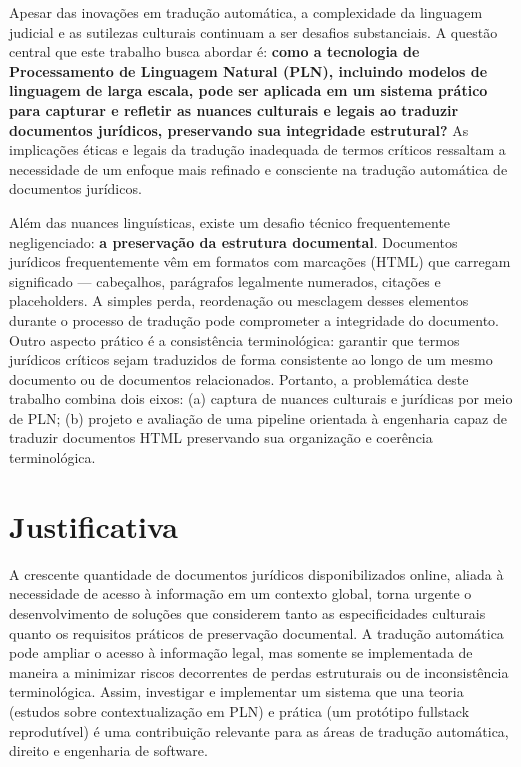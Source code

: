 Apesar das inovações em tradução automática, a complexidade da linguagem judicial e as sutilezas culturais continuam a ser desafios substanciais. A questão central que este trabalho busca abordar é: \textbf{como a tecnologia de Processamento de Linguagem Natural (PLN), incluindo modelos de linguagem de larga escala, pode ser aplicada em um sistema prático para capturar e refletir as nuances culturais e legais ao traduzir documentos jurídicos, preservando sua integridade estrutural?} As implicações éticas e legais da tradução inadequada de termos críticos ressaltam a necessidade de um enfoque mais refinado e consciente na tradução automática de documentos jurídicos.

Além das nuances linguísticas, existe um desafio técnico frequentemente negligenciado: \textbf{a preservação da estrutura documental}. Documentos jurídicos frequentemente vêm em formatos com marcações (HTML) que carregam significado — cabeçalhos, parágrafos legalmente numerados, citações e placeholders. A simples perda, reordenação ou mesclagem desses elementos durante o processo de tradução pode comprometer a integridade do documento. Outro aspecto prático é a consistência terminológica: garantir que termos jurídicos críticos sejam traduzidos de forma consistente ao longo de um mesmo documento ou de documentos relacionados. Portanto, a problemática deste trabalho combina dois eixos: (a) captura de nuances culturais e jurídicas por meio de PLN; (b) projeto e avaliação de uma pipeline orientada à engenharia capaz de traduzir documentos HTML preservando sua organização e coerência terminológica.

\section{Justificativa}

A crescente quantidade de documentos jurídicos disponibilizados online, aliada à necessidade de acesso à informação em um contexto global, torna urgente o desenvolvimento de soluções que considerem tanto as especificidades culturais quanto os requisitos práticos de preservação documental. A tradução automática pode ampliar o acesso à informação legal, mas somente se implementada de maneira a minimizar riscos decorrentes de perdas estruturais ou de inconsistência terminológica. Assim, investigar e implementar um sistema que una teoria (estudos sobre contextualização em PLN) e prática (um protótipo fullstack reprodutível) é uma contribuição relevante para as áreas de tradução automática, direito e engenharia de software.

